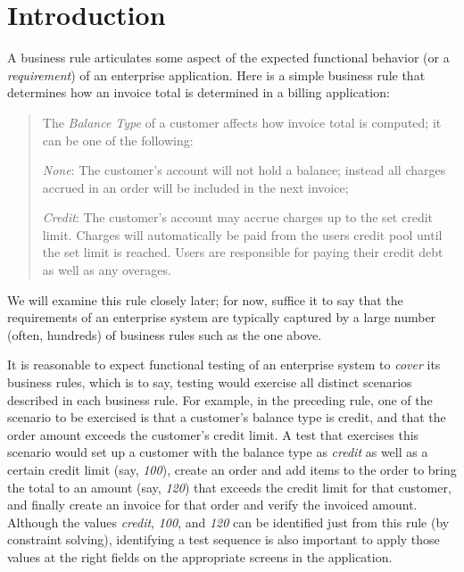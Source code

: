 \section{Introduction}

A business rule articulates some aspect of the expected functional behavior (or
a \textit{requirement}) of an enterprise application. Here is a simple business
rule that determines how an invoice total is determined in a billing
application:
%
\begin{quote}
{\small
	
The \textit{Balance Type} of a customer affects how invoice total is computed;
it can be one of the following:

\textit{None}: The customer's account will not hold a balance; instead all
charges accrued in an order will be included in the next invoice;
	
\textit{Credit}: The customer's account may accrue charges up to the set credit
limit.  Charges will automatically be paid from the users credit pool until the
set limit is reached.  Users are responsible for paying their credit debt as
well as any overages.

}
\end{quote}	
%
We will examine this rule closely later; for now, suffice it to say that the
requirements of an enterprise system are typically captured by a large number
(often, hundreds) of business rules such as the one above.

It is reasonable to expect functional testing of an enterprise system to
\textit{cover} its business rules, which is to say, testing would exercise all
distinct scenarios described in each business rule.  For example, in the
preceding rule, one of the scenario to be exercised is that a customer's balance
type is credit, and that the order amount exceeds the customer's credit limit.
A test that exercises this scenario would set up a customer with the balance
type as \textit{credit} as well as a certain credit limit (say, \textit{100}),
create an order and add items to the order to bring the total to an amount (say,
\textit{120}) that exceeds the credit limit for that customer, and finally
create an invoice for that order and verify the invoiced amount.
Although the values
\textit{credit}, \textit{100}, and \textit{120} can be identified just from this
rule (by constraint solving), identifying a test sequence is also important to
apply those values at the right fields on the appropriate
screens in the application.

